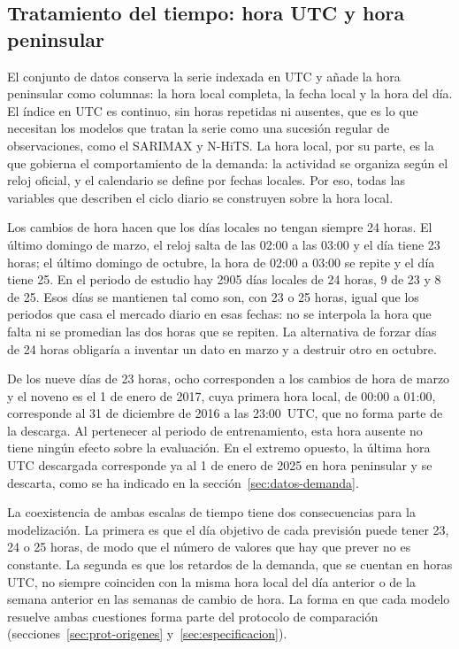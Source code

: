 \subsection{Tratamiento del tiempo: hora UTC y hora peninsular}\label{sec:datos-tiempo}

El conjunto de datos conserva la serie indexada en UTC y añade la hora
peninsular como columnas: la hora local completa, la fecha local y la hora
del día. El índice en UTC es continuo, sin horas repetidas ni ausentes, que
es lo que necesitan los modelos que tratan la serie como una sucesión
regular de observaciones, como el SARIMAX y N-HiTS. La hora local, por su
parte, es la que gobierna el comportamiento de la demanda: la actividad se
organiza según el reloj oficial, y el calendario se define por fechas
locales. Por eso, todas las variables que describen el ciclo diario se
construyen sobre la hora local.

Los cambios de hora hacen que los días locales no tengan siempre 24 horas.
El último domingo de marzo, el reloj salta de las 02:00 a las 03:00 y el
día tiene 23 horas; el último domingo de octubre, la hora de 02:00 a 03:00
se repite y el día tiene 25. En el periodo de estudio hay 2905 días locales
de 24 horas, 9 de 23 y 8 de 25. Esos días se mantienen tal como son, con 23
o 25 horas, igual que los periodos que casa el mercado diario en esas
fechas: no se interpola la hora que falta ni se promedian las dos horas que
se repiten. La alternativa de forzar días de 24 horas obligaría a inventar
un dato en marzo y a destruir otro en octubre.

De los nueve días de 23 horas, ocho corresponden a los cambios de hora de
marzo y el noveno es el 1 de enero de 2017, cuya primera hora local, de
00:00 a 01:00, corresponde al 31 de diciembre de 2016 a las 23:00~UTC, que
no forma parte de la descarga. Al pertenecer al periodo de entrenamiento,
esta hora ausente no tiene ningún efecto sobre la evaluación. En el extremo
opuesto, la última hora UTC descargada corresponde ya al 1 de enero de 2025
en hora peninsular y se descarta, como se ha indicado en la
sección~\ref{sec:datos-demanda}.

La coexistencia de ambas escalas de tiempo tiene dos consecuencias para la
modelización. La primera es que el día objetivo de cada previsión puede
tener 23, 24 o 25 horas, de modo que el número de valores que hay que prever
no es constante. La segunda es que los retardos de la demanda, que se
cuentan en horas UTC, no siempre coinciden con la misma hora local del día
anterior o de la semana anterior en las semanas de cambio de hora. La forma
en que cada modelo resuelve ambas cuestiones forma parte del protocolo de
comparación (secciones~\ref{sec:prot-origenes} y~\ref{sec:especificacion}).


